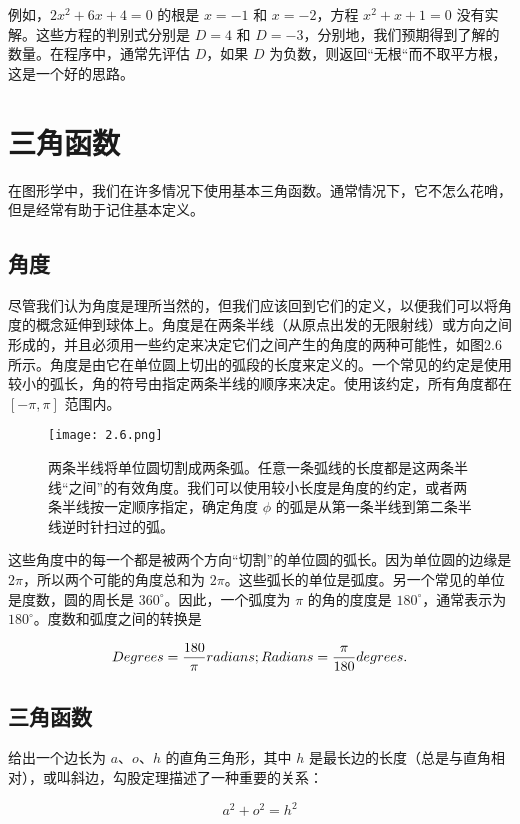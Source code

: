 \documentclass[lang=cn,12pt]{elegantbook}
\begin{document}
例如，$2x^2+6x+4=0$ 的根是 $x=-1$ 和 $x=-2$，方程 $x^2+x+1=0$ 没有实解。这些方程的判别式分别是 $D=4$ 和 $D=-3$，分别地，我们预期得到了解的数量。在程序中，通常先评估 $D$，如果 $D$ 为负数，则返回``无根“而不取平方根，这是一个好的思路。

\section{三角函数}

在图形学中，我们在许多情况下使用基本三角函数。通常情况下，它不怎么花哨，但是经常有助于记住基本定义。

\subsection{角度}

尽管我们认为角度是理所当然的，但我们应该回到它们的定义，以便我们可以将角度的概念延伸到球体上。角度是在两条半线（从原点出发的无限射线）或方向之间形成的，并且必须用一些约定来决定它们之间产生的角度的两种可能性，如图2.6所示。角度是由它在单位圆上切出的弧段的长度来定义的。一个常见的约定是使用较小的弧长，角的符号由指定两条半线的顺序来决定。使用该约定，所有角度都在 $[-\pi, \pi]$ 范围内。

\begin{figure}[htbp]
\centering
\texttt{[image: 2.6.png]}
\caption{两条半线将单位圆切割成两条弧。任意一条弧线的长度都是这两条半线“之间”的有效角度。我们可以使用较小长度是角度的约定，或者两条半线按一定顺序指定，确定角度 $\phi$ 的弧是从第一条半线到第二条半线逆时针扫过的弧。}
\end{figure}

这些角度中的每一个都是被两个方向“切割”的单位圆的弧长。因为单位圆的边缘是 $2\pi$，所以两个可能的角度总和为 $2\pi$。这些弧长的单位是弧度。另一个常见的单位是度数，圆的周长是 $360^\circ$。因此，一个弧度为 $\pi$ 的角的度度是 $180^\circ$，通常表示为 $180^\circ$。度数和弧度之间的转换是

$$
Degrees =\frac{180}{\pi} radians; \\
Radians =\frac{\pi}{180} degrees.
$$

\subsection{三角函数}

给出一个边长为 $a$、$o$、$h$ 的直角三角形，其中 $h$ 是最长边的长度（总是与直角相对），或叫斜边，勾股定理描述了一种重要的关系：

$$
a^2+o^2=h^2
$$
\end{document}
